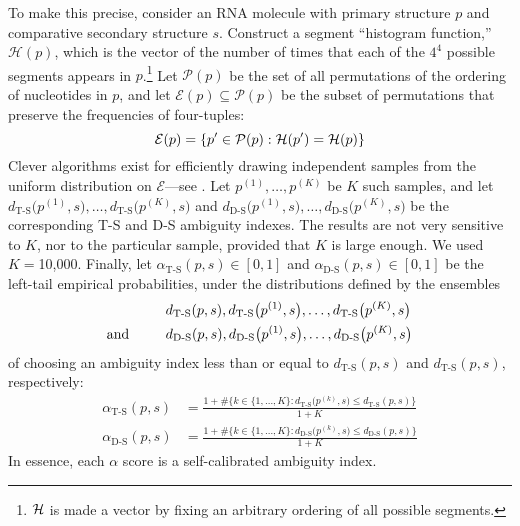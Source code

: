 \documentclass[10pt,letterpaper]{article}
\begin{document}
To make this precise, consider an RNA molecule with primary structure $p$ and comparative secondary structure $s$. Construct a segment ``histogram function,'' $\mathcal{H}(p)$, which is the 
vector of the number of times that each of the $4^4$ possible segments appears in $p$.\footnote{${\cal H}$ is made a vector by fixing an arbitrary ordering of all possible segments.}
Let $\mathcal{P}(p)$ be the set of all permutations of the ordering of nucleotides in $p$, and let 
$\mathcal{E}(p)\subseteq\mathcal{P}(p)$ be the subset of permutations that preserve the frequencies of four-tuples:
\[
{\cal E}(p) = \{p'\in\mathcal{P}(p): {\cal H}(p')={\cal H}(p)\}
\]
Clever algorithms exist for efficiently drawing independent samples from the uniform distribution on $\mathcal{E}$---see \cite{Kandel1996-kz, Fitch1983-ec, Altschul1985-nq}. Let $p^{(1)},
\ldots,p^{(K)}$ be $K$ such samples, and let $\displaystyle
d_\text{T-S}\big(p^{(1)},s\big),\ldots,d_\text{T-S}\big(p^{(K)},s\big)$ and
$\displaystyle
d_\text{D-S}\big(p^{(1)},s\big),\ldots,d_\text{D-S}\big(p^{(K)},s\big)$ 
be the corresponding T-S and D-S ambiguity indexes. The results are not very sensitive to $K$, nor to the particular sample, provided that $K$ is large enough. We used $K=$10,000. Finally, let 
$\alpha_\text{T-S}(p,s) \in [0,1]$ and
$\alpha_\text{D-S}(p,s) \in [0,1]$
be the left-tail empirical probabilities, under the distributions defined by the ensembles
\begin{align}
&  d_\text{T-S}(p,s),d_\text{T-S}\big(p^{(1)},s\big),\ldots,d_\text{T-S}\big(p^{(K)},s\big) 
\label{eqn:T-Sensemble}\\
\text{and \hglue .8cm} 
& d_\text{D-S}(p,s),d_\text{D-S}\big(p^{(1)},s\big),\ldots,d_\text{D-S}\big(p^{(K)},s\big) 
\label{eqn:D-Sensemble}
\end{align}
of choosing an ambiguity index less than or equal to $d_\text{T-S}(p,s)$ and 
$d_\text{T-S}(p,s)$, respectively:
\begin{align}
\alpha_\text{T-S}(p,s)  & = \frac
{1 + \#\{k\in\{1,\ldots,K\}: d_\text{T-S}\big(p^{(k)},s\big) \leq d_\text{T-S}(p,s)\}}{1+K} \label{eqn:alpha_T-S} \\
\alpha_\text{D-S}(p,s)  & = \frac
{1 + \#\{k\in\{1,\ldots,K\}: d_\text{D-S}\big(p^{(k)},s\big)\leq d_\text{D-S}(p,s)\}}{1+K} \label{eqn:alpha_D-S}
\end{align}
In essence, each $\alpha$ score is a self-calibrated ambiguity index.
\end{document}
